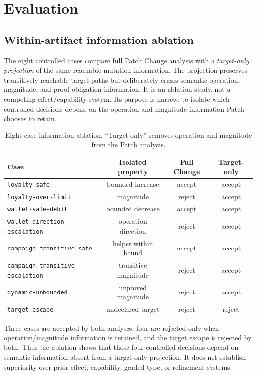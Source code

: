 \documentclass[10pt]{article}
\theoremstyle{plain}
\theoremstyle{remark}
\begin{document}
\section{Evaluation}
\subsection{Within-artifact information ablation}
The eight controlled cases compare full Patch Change analysis with a \emph{target-only projection} of the same reachable mutation information. The projection preserves transitively reachable target paths but deliberately erases semantic operation, magnitude, and proof-obligation information. It is an ablation study, not a competing effect/capability system. Its purpose is narrow: to isolate which controlled decisions depend on the operation and magnitude information Patch chooses to retain.

\begin{table}[t]
\centering
\caption{Eight-case information ablation. ``Target-only'' removes operation and magnitude from the Patch analysis.}
\label{tab:security-ablation}
\small
\begin{tabular}{@{}lccc@{}}
\toprule
Case & Isolated property & Full Change & Target-only \\
\midrule
\texttt{loyalty-safe} & bounded increase & accept & accept \\
\texttt{loyalty-over-limit} & magnitude & reject & accept \\
\texttt{wallet-safe-debit} & bounded decrease & accept & accept \\
\texttt{wallet-direction-escalation} & operation direction & reject & accept \\
\texttt{campaign-transitive-safe} & helper within bound & accept & accept \\
\texttt{campaign-transitive-escalation} & transitive magnitude & reject & accept \\
\texttt{dynamic-unbounded} & unproved magnitude & reject & accept \\
\texttt{target-escape} & undeclared target & reject & reject \\
\bottomrule
\end{tabular}
\end{table}

Three cases are accepted by both analyses, four are rejected only when operation/magnitude information is retained, and the target escape is rejected by both. Thus the ablation shows that those four controlled decisions depend on semantic information absent from a target-only projection. It does not establish superiority over prior effect, capability, graded-type, or refinement systems.
\end{document}
